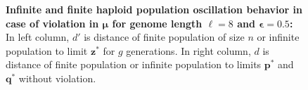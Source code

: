 \begin{figure}[h]
\begin{center}
\hspace{-3em}%
\vspace{-0.5em} \hspace{-3em}%


\caption{\textbf{Infinite and finite haploid population oscillation behavior in case of violation in $\bm{\mu}$ for genome length $\ell = 8$ and $\bm{\epsilon} = 0.5$:} 
  In left column, $d'$ is distance of finite population of size $n$ or infinite population to limit $\bm{z}^\ast$ for $g$ generations. In right column, $d$ is distance of finite population or infinite population to limits $\bm{p}^\ast$ and $\bm{q}^\ast$ without violation.}
\label{oscillation_8h_vio_mu_0.5}
\end{center}
\end{figure}

